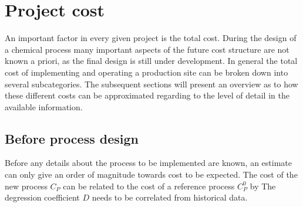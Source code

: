     \section{Project cost}
    \label{sec:ProjectCost}

    An important factor in every given project is the total cost. During the design of a chemical process many
    important aspects of the future cost structure are not known a priori, as the final design is still under development.
    In general the total cost of implementing and operating a production site can be broken down into
    several subcategories.
    The subsequent sections will present an overview as to how these different costs can be approximated
    regarding to the level of detail in the available information.

        \subsection{Before process design}
        \label{sec:before}
        Before any details about the process to be implemented are known, an estimate can only give an
        order of magnitude towards cost to be expected. The cost of the new process $C_P$ can be
        related to the cost of a reference process $C_{P}^0$ by
        The degression coefficient $D$ needs to be correlated from historical data.

